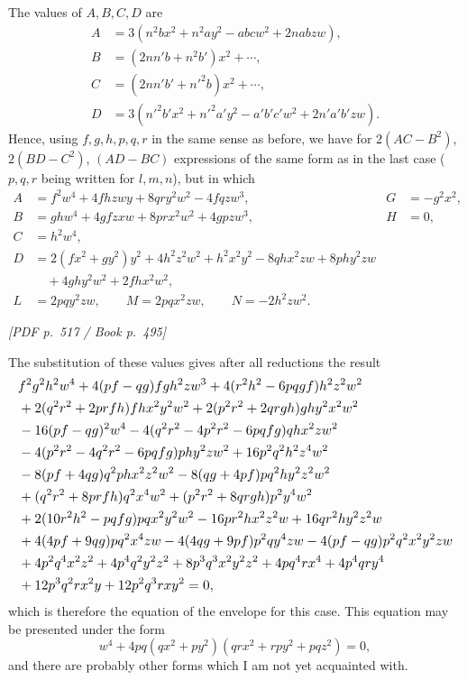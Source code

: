 \documentclass[11pt]{article}
\newcommand{\Page}[2]{\bigskip\noindent\textit{[PDF p.~#1 / Book p.~#2]}\par\smallskip}
\begin{document}
The values of $A,B,C,D$ are
\[
\begin{aligned}
A&=3(n^2bx^2+n^2ay^2-abcw^2+2nabzw),\\
B&=(2nn'b+n^2b')x^2+\cdots,\\
C&=(2nn'b'+n'^2b)x^2+\cdots,\\
D&=3(n'^2b'x^2+n'^2a'y^2-a'b'c'w^2+2n'a'b'zw).
\end{aligned}
\]
Hence, using $f,g,h,p,q,r$ in the same sense as before, we have for
$2(AC-B^2)$, $2(BD-C^2)$, $(AD-BC)$ expressions of the same form as in the
last case ($p,q,r$ being written for $l,m,n$), but in which
\[
\begin{array}{rlrl}
A&=f^2w^4+4fhzwy+8qry^2w^2-4fqzw^3,&G&=-g^2x^2,\\
B&=ghw^4+4gfzxw+8prx^2w^2+4gpzw^3,&H&=0,\\
C&=h^2w^4,\\
D&=2(fx^2+gy^2)y^2+4h^2z^2w^2+h^2x^2y^2-8qhx^2zw+8phy^2zw\\
&\quad +4ghy^2w^2+2fhx^2w^2,\\
L&=2pqy^2zw,\qquad M=2pqx^2zw,\qquad N=-2h^2zw^2.
\end{array}
\]

\Page{517}{495}

The substitution of these values gives after all reductions the result
\[
\resizebox{\textwidth}{!}{$\displaystyle
\begin{aligned}
&f^2g^2h^2w^4+4(pf-qg)fgh^2zw^3
+4(r^2h^2-6pqgf)h^2z^2w^2\\
&+2(q^2r^2+2prfh)f h x^2y^2w^2
+2(p^2r^2+2qrgh)g h y^2x^2w^2\\
&-16(pf-qg)^2w^4
-4(q^2r^2-4p^2r^2-6pqfg)qh x^2zw^2\\
&-4(p^2r^2-4q^2r^2-6pqfg)ph y^2zw^2
+16p^2q^2h^2z^4w^2\\
&-8(pf+4qg)q^2phx^2z^2w^2
-8(qg+4pf)pq^2h y^2z^2w^2\\
&+(q^2r^2+8prfh)q^2x^4w^2
+(p^2r^2+8qrgh)p^2y^4w^2\\
&+2(10r^2h^2-pqfg)pqx^2y^2w^2
-16pr^2h x^2z^2w+16qr^2h y^2z^2w\\
&+4(4pf+9qg)pq^2x^4zw-4(4qg+9pf)p^2qy^4zw
-4(pf-qg)p^2q^2x^2y^2zw\\
&+4p^2q^4x^2z^2+4p^4q^2y^2z^2+8p^3q^3x^2y^2z^2
+4p q^4 r x^4+4p^4q r y^4\\
&+12p^3q^2r x^2y+12p^2q^3rxy^2=0,
\end{aligned}$}
\]
which is therefore the equation of the envelope for this case. This equation may be
presented under the form
\[
        w^4+4pq(qx^2+py^2)(qrx^2+rpy^2+pqz^2)=0,
\]
and there are probably other forms which I am not yet acquainted with.
\end{document}
